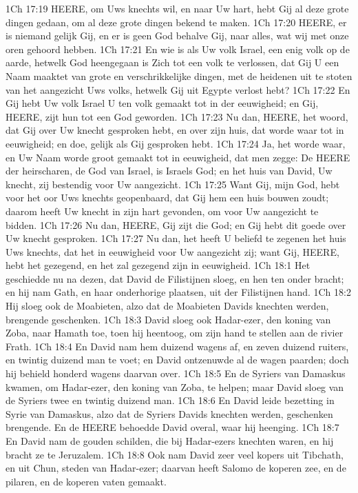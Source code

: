 1Ch 17:19  HEERE, om Uws knechts wil, en naar Uw hart, hebt Gij al deze grote dingen gedaan, om al deze grote dingen bekend te maken.
1Ch 17:20  HEERE, er is niemand gelijk Gij, en er is geen God behalve Gij, naar alles, wat wij met onze oren gehoord hebben.
1Ch 17:21  En wie is als Uw volk Israel, een enig volk op de aarde, hetwelk God heengegaan is Zich tot een volk te verlossen, dat Gij U een Naam maaktet van grote en verschrikkelijke dingen, met de heidenen uit te stoten van het aangezicht Uws volks, hetwelk Gij uit Egypte verlost hebt?
1Ch 17:22  En Gij hebt Uw volk Israel U ten volk gemaakt tot in der eeuwigheid; en Gij, HEERE, zijt hun tot een God geworden.
1Ch 17:23  Nu dan, HEERE, het woord, dat Gij over Uw knecht gesproken hebt, en over zijn huis, dat worde waar tot in eeuwigheid; en doe, gelijk als Gij gesproken hebt.
1Ch 17:24  Ja, het worde waar, en Uw Naam worde groot gemaakt tot in eeuwigheid, dat men zegge: De HEERE der heirscharen, de God van Israel, is Israels God; en het huis van David, Uw knecht, zij bestendig voor Uw aangezicht.
1Ch 17:25  Want Gij, mijn God, hebt voor het oor Uws knechts geopenbaard, dat Gij hem een huis bouwen zoudt; daarom heeft Uw knecht in zijn hart gevonden, om voor Uw aangezicht te bidden.
1Ch 17:26  Nu dan, HEERE, Gij zijt die God; en Gij hebt dit goede over Uw knecht gesproken.
1Ch 17:27  Nu dan, het heeft U beliefd te zegenen het huis Uws knechts, dat het in eeuwigheid voor Uw aangezicht zij; want Gij, HEERE, hebt het gezegend, en het zal gezegend zijn in eeuwigheid.
1Ch 18:1  Het geschiedde nu na dezen, dat David de Filistijnen sloeg, en hen ten onder bracht; en hij nam Gath, en haar onderhorige plaatsen, uit der Filistijnen hand.
1Ch 18:2  Hij sloeg ook de Moabieten, alzo dat de Moabieten Davids knechten werden, brengende geschenken.
1Ch 18:3  David sloeg ook Hadar-ezer, den koning van Zoba, naar Hamath toe, toen hij heentoog, om zijn hand te stellen aan de rivier Frath.
1Ch 18:4  En David nam hem duizend wagens af, en zeven duizend ruiters, en twintig duizend man te voet; en David ontzenuwde al de wagen paarden; doch hij behield honderd wagens daarvan over.
1Ch 18:5  En de Syriers van Damaskus kwamen, om Hadar-ezer, den koning van Zoba, te helpen; maar David sloeg van de Syriers twee en twintig duizend man.
1Ch 18:6  En David leide bezetting in Syrie van Damaskus, alzo dat de Syriers Davids knechten werden, geschenken brengende. En de HEERE behoedde David overal, waar hij heenging.
1Ch 18:7  En David nam de gouden schilden, die bij Hadar-ezers knechten waren, en hij bracht ze te Jeruzalem.
1Ch 18:8  Ook nam David zeer veel kopers uit Tibchath, en uit Chun, steden van Hadar-ezer; daarvan heeft Salomo de koperen zee, en de pilaren, en de koperen vaten gemaakt.

